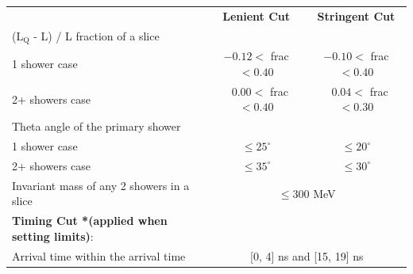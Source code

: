 \begin{table}[htbp!]
\begin{center}
\begin{tabular}{| p{7.75cm} | m{3.25cm} | m{3.25cm} |}
 & \multicolumn{1}{c|}{\textbf{Lenient Cut}}  & \multicolumn{1}{c|}{\textbf{Stringent Cut}} \\  
 \cline{2-3}
 (L$_\mathrm{Q}$ - L) / L fraction of a slice &  &  \\
  \hspace{0.5cm} 1 shower case & \multicolumn{1}{c|}{$-0.12 <$ frac $< 0.40$} & \multicolumn{1}{c|}{$-0.10 <$ frac $< 0.40$} \\
  \hspace{0.5cm} 2+ showers case & \multicolumn{1}{c|}{$\ \ \ 0.00 <$ frac $< 0.40$} & \multicolumn{1}{c|}{$\ \ \ 0.04 <$ frac $< 0.30$} \\ [1ex]
  Theta angle of the primary shower &  &  \\
  \hspace{0.5cm}1 shower case & \multicolumn{1}{c|}{$\leq 25^\circ$} & \multicolumn{1}{c|}{$\leq20^\circ$} \\
  \hspace{0.5cm}2+ showers case & \multicolumn{1}{c|}{$\leq 35^\circ$} & \multicolumn{1}{c|}{$\leq 30^\circ$} \\ [1ex]
  \cline{2-3} 
  Invariant mass of any 2 showers in a slice  & \multicolumn{2}{c|}{$\leq 300$ MeV} \\ [1ex]
 \hline
 \textbf{Timing Cut *(applied when setting limits)}: &  \multicolumn{2}{c|}{} \\ [1ex] 
 Arrival time within the arrival time  & \multicolumn{2}{c|}{[0, 4] ns and [15, 19] ns} \\ [1ex]
 \hline
\end{tabular}
\end{center}
\end{table}

